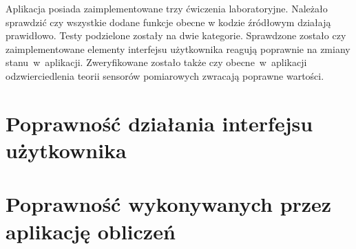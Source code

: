 Aplikacja posiada zaimplementowane trzy ćwiczenia laboratoryjne. Należało sprawdzić czy wszystkie
dodane funkcje obecne w kodzie źródłowym działają prawidłowo. Testy podzielone zostały na dwie
kategorie. Sprawdzone zostało czy zaimplementowane elementy interfejsu użytkownika reagują poprawnie
na zmiany stanu~w~aplikacji. Zweryfikowane zostało także czy obecne~w~aplikacji odzwierciedlenia
teorii sensorów pomiarowych zwracają poprawne wartości.

\section{Poprawność działania interfejsu użytkownika}


\section{Poprawność wykonywanych przez aplikację obliczeń}
